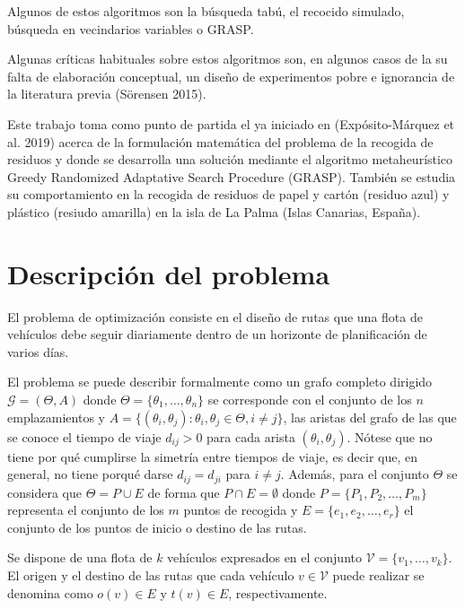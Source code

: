 \documentclass[
]{article}
\begin{document}
Algunos de estos algoritmos son la búsqueda tabú, el recocido simulado,
búsqueda en vecindarios variables o GRASP.

Algunas críticas habituales sobre estos algoritmos son, en algunos casos
de la su falta de elaboración conceptual, un diseño de experimentos
pobre e ignorancia de la literatura previa (Sörensen 2015).

Este trabajo toma como punto de partida el ya iniciado en
(Expósito-Márquez et al. 2019) acerca de la formulación matemática del
problema de la recogida de residuos y donde se desarrolla una solución
mediante el algoritmo metaheurístico Greedy Randomized Adaptative Search
Procedure (GRASP). También se estudia su comportamiento en la recogida
de residuos de papel y cartón (residuo azul) y plástico (resiudo
amarilla) en la isla de La Palma (Islas Canarias, España).

\hypertarget{descripciuxf3n-del-problema}{%
\section{Descripción del problema}\label{descripciuxf3n-del-problema}}

El problema de optimización consiste en el diseño de rutas que una flota
de vehículos debe seguir diariamente dentro de un horizonte de
planificación de varios días.

El problema se puede describir formalmente como un grafo completo
dirigido \(\mathcal{G} = (\Theta, A)\) donde
\(\Theta=\{\theta_1,\ldots, \theta_n\}\) se corresponde con el conjunto
de los \(n\) emplazamientos y
\(A=\{(\theta_i,\theta_j):\theta_i,\theta_j\in\Theta, i\neq j\}\), las
aristas del grafo de las que se conoce el tiempo de viaje \(d_{ij}>0\)
para cada arista \((\theta_i, \theta_j)\). Nótese que no tiene por qué
cumplirse la simetría entre tiempos de viaje, es decir que, en general,
no tiene porqué darse \(d_{ij} = d_{ji}\) para \(i\neq j\). Además, para
el conjunto \(\Theta\) se considera que \(\Theta = P \cup E\) de forma
que \(P\cap E = \emptyset\) donde \(P=\{P_1,P_2,\ldots,P_m\}\)
representa el conjunto de los \(m\) puntos de recogida y
\(E=\{e_1,e_2,\ldots,e_r\}\) el conjunto de los puntos de inicio o
destino de las rutas.

Se dispone de una flota de \(k\) vehículos expresados en el conjunto
\(\mathcal{V} = \{v_1,\ldots, v_k\}\). El origen y el destino de las
rutas que cada vehículo \(v\in\mathcal{V}\) puede realizar se denomina
como \(o(v)\in E\) y \(t(v)\in E\), respectivamente.
\end{document}
